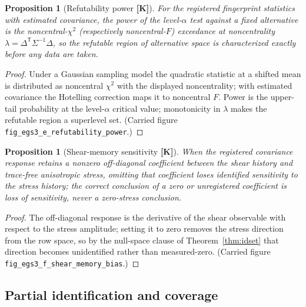 \documentclass[10pt]{article}
\newtheorem{proposition}[theorem]{Proposition}
\theoremstyle{definition}
\newcommand{\code}[1]{\texttt{\small #1}}
\newcommand{\tier}[1]{\textbf{[#1]}}
\begin{document}
\begin{proposition}[Refutability power \tier{K}]
\label{prop:power}
For the registered fingerprint statistics with estimated covariance,
the power of the level-$\alpha$ test against a fixed alternative is
the noncentral-$\chi^2$ (respectively noncentral-$F$) exceedance at
noncentrality $\lambda = \Delta^{\mathsf T}\Sigma^{-1}\Delta$, so the
refutable region of alternative space is characterized exactly before
any data are taken.
\end{proposition}
\begin{proof}
Under a Gaussian sampling model the quadratic statistic at a shifted
mean is distributed as noncentral $\chi^2$ with the displayed
noncentrality; with estimated covariance the Hotelling correction
maps it to noncentral $F$. Power is the upper-tail probability at the
level-$\alpha$ critical value; monotonicity in $\lambda$ makes the
refutable region a superlevel set. (Carried figure
\code{fig\_egs3\_e\_refutability\_power}.)
\end{proof}

\begin{proposition}[Shear-memory sensitivity \tier{K}]
\label{prop:shearmem}
When the registered covariance response retains a nonzero off-diagonal
coefficient between the shear history and trace-free anisotropic
stress, omitting that coefficient loses identified sensitivity to the
stress history; the correct conclusion of a zero or unregistered
coefficient is loss of sensitivity, never a zero-stress conclusion.
\end{proposition}
\begin{proof}
The off-diagonal response is the derivative of the shear observable
with respect to the stress amplitude; setting it to zero removes the
stress direction from the row space, so by the null-space clause of
Theorem~\ref{thm:idset} that direction becomes unidentified rather
than measured-zero. (Carried figure
\code{fig\_egs3\_f\_shear\_memory\_bias}.)
\end{proof}

\subsection{Partial identification and coverage}
\end{document}
